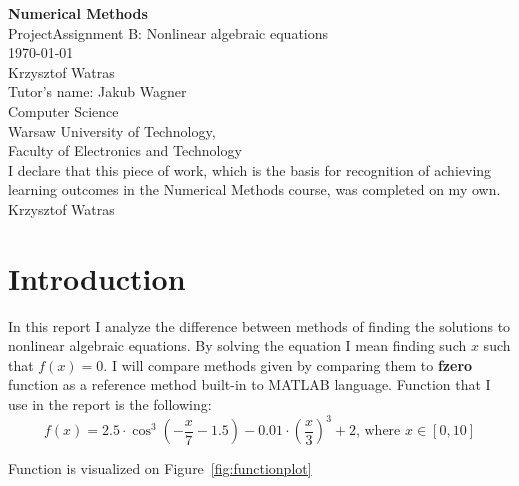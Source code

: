 \documentclass[11pt]{article}
\begin{document}
\begin{titlepage}
   \begin{center}
       \vspace*{1cm}
       \textbf{\Huge Numerical Methods} \\
       \vspace{2.0cm}
       \huge{ProjectAssignment B: Nonlinear algebraic equations} \\
       \vspace{.7cm}
       \huge{\today} \\
       \vspace{3.0cm}
       \vspace{0.4cm}
       Krzysztof Watras\\
       \vspace{ 0.2cm }
       \small{ Tutor's name: Jakub Wagner } \\
       \vspace{2 cm}   
       \small{Computer Science} \\  
       \vspace{0.2cm}       
       \small{Warsaw University of Technology,\\
       Faculty of Electronics and Technology} \\
       \vspace{2cm}
       \small{I declare that this piece of work, which is the basis for
       recognition of achieving learning outcomes in the Numerical Methods
       course, was completed on my own. Krzysztof Watras} \\
   \end{center}
\end{titlepage} 
\tableofcontents

\newpage
\section{Introduction}
In this report I analyze the difference between methods of finding the
solutions to nonlinear algebraic equations. By solving the equation I mean
finding such $x$ such that $f(x) = 0$. I will compare methods given by
comparing them to \textbf{fzero} function as a reference method built-in to
MATLAB language. Function that I use in the report is the following:
\begin{equation}
    f(x) = 2.5\cdot \cos^3(-\frac{x}{7}-1.5) - 0.01\cdot
    \left(\frac{x}{3}\right)^3 + 2 
    \mbox{, where } x \in [0,10]
\end{equation}

Function is visualized on Figure~\ref{fig:functionplot}
\end{document}
